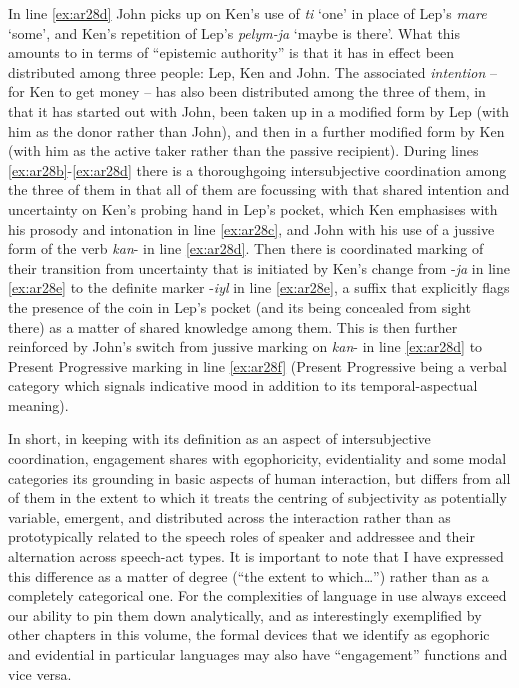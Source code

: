 \documentclass[output=paper]{langsci/langscibook}
\begin{document}
In line \ref{ex:ar28d} John picks up on Ken’s use of \textit{ti} ‘one’ in place of Lep’s \textit{mare} ‘some’, and Ken’s repetition of Lep’s \textit{pelym-ja} ‘maybe is there’. What this amounts to in terms of “epistemic authority” is that it has in effect been distributed among three people:  Lep, Ken and John. The associated \textit{intention}  – for Ken to get money – has also been distributed among the three of them, in that it has started out with John, been taken up in a modified form by Lep (with him as the donor rather than John), and then in a further modified form by Ken (with him as the active taker rather than the passive recipient). During lines \ref{ex:ar28b}-\ref{ex:ar28d} there is a thoroughgoing  intersubjective coordination among the three of them in that all of them are focussing with that shared intention and uncertainty on Ken’s probing hand in Lep’s pocket, which Ken emphasises with his prosody and intonation in line \ref{ex:ar28c}, and John with his use of a jussive form of the verb \textit{kan}- in line \ref{ex:ar28d}. Then there is coordinated marking of their transition from uncertainty that is initiated by Ken’s change from -\textit{ja} in line \ref{ex:ar28e} to the definite marker -\textit{iyl} in line \ref{ex:ar28e},  a suffix that explicitly flags the presence of the coin in Lep’s pocket (and its being concealed from sight there) as a matter of shared knowledge among them. This is then further reinforced by John’s switch from jussive marking on \textit{kan}- in line \ref{ex:ar28d} to Present Progressive marking in line \ref{ex:ar28f}  (Present Progressive being a verbal category which signals indicative mood in addition to its temporal-aspectual meaning).

In short, in keeping with its definition as an aspect of intersubjective coordination, engagement shares with egophoricity, evidentiality and some modal categories its grounding in basic aspects of human interaction, but differs from all of them in the extent to which it treats the centring of subjectivity as potentially variable, emergent,  and distributed across the interaction rather than as prototypically related to the speech roles of speaker and addressee and their alternation across speech-act types. It is important to note that I have expressed this difference as a matter of degree (“the extent to which…”) rather than as a completely categorical one. For the complexities of language in use always exceed our ability to pin them down analytically, and as interestingly exemplified by other chapters in this volume, the formal devices that we identify as egophoric and evidential in particular languages may also have “engagement” functions and vice versa.
\end{document}
